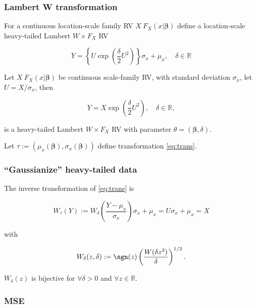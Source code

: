 \documentclass{beamer}
\newcommand{\Real}{\mathbb{R}}
\newcommand{\vect}[1]{\boldsymbol{#1}}
\begin{document}
\begin{frame}

    \frametitle{Lambert W transformation}


For a continuous location-scale family RV $X~F_X(x|\vect{\beta})$ define a
location-scale heavy-tailed Lambert $W\times F_X$ RV

\begin{equation}\label{eq:trans}
Y=\left\lbrace U\exp\left(\frac{\delta}{2}U^2\right)\right\rbrace
\sigma_x+\mu_x,\quad\delta\in\Real
\end{equation}

Let $X~F_X(x|\vect{\beta})$ be continuous scale-family RV, with
standard deviation $\sigma_x$, let $U=X/\sigma_x$, then

\begin{equation}
Y=X\exp\left(\frac{\delta}{2}U^2\right),\quad\delta\in\Real,
\end{equation}

is a heavy-tailed Lambert $W\times F_X$ RV with parameter 
$\theta=(\vect{\beta},\delta)$.

Let $\tau:=(\mu_x(\vect{\beta}),\sigma_x(\vect{\beta}))$ define transformation
\cref{eq:trans}.

\end{frame}

\begin{frame}

    \frametitle{``Gaussianize'' heavy-tailed data}
The inverse transformation of \cref{eq:trans} is

\begin{equation}
W_\tau(Y):=W_\delta\left(\frac{Y-\mu_x}{\sigma_x}\right)\sigma_x
+\mu_x = U\sigma_x+\mu_x=X
\end{equation}

with

\begin{equation}
W_\delta(z,\delta) := \sgn(z)\left(\frac{W(\delta z^2)}{\delta}\right)^{1/2}.
\end{equation}

$W_\delta(z)$ is bijective for $\forall \delta>0$ and $\forall z\in\Real$.
\end{frame}

\begin{frame}

    \frametitle{MSE}



\end{frame}





%
\end{document}
